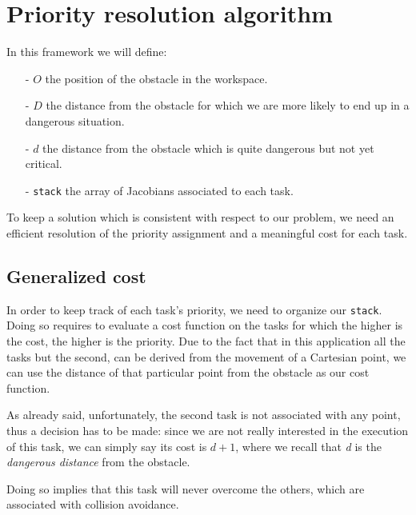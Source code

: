 \documentclass[12pt, a4paper]{article}
\begin{document}
\section{Priority resolution algorithm}
In this framework we will define:
\begin{enumerate}
\item[-] $O$ the position of the obstacle in the workspace.
\item[-] $D$ the distance from the obstacle for which we are more likely to end up in a dangerous situation.
\item[-] $d$ the distance from the obstacle which is quite dangerous but not yet critical.
\item[-] \texttt{stack} the array of Jacobians associated to each task.
\end{enumerate}
To keep a solution which is consistent with respect to our problem, we need an efficient resolution of the priority assignment and a meaningful cost for each task.
\subsection{Generalized cost}
In order to keep track of each task's priority, we need to organize our \texttt{stack}. Doing so requires to evaluate a cost function on the tasks for which the higher is the cost, the higher is the priority. Due to the fact that in this application all the tasks but the second, can be derived from the movement of a Cartesian point, we can use the distance of that particular point from the obstacle as our cost function.

As already said, unfortunately, the second task is not associated with any point, thus a decision has to be made: since we are not really interested in the execution of this task, we can simply say its cost is $d+1$, where we recall that \textit{d} is the \emph{dangerous distance} from the obstacle.

Doing so implies that this task will never overcome the others, which are associated with collision avoidance.


\end{document}
